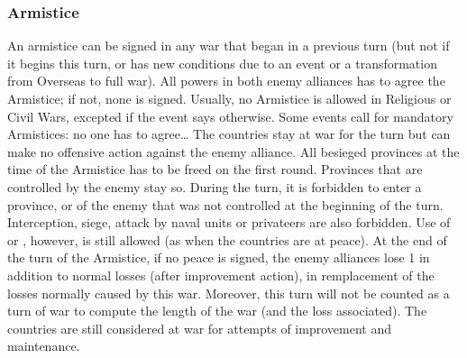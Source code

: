 \subsubsection{Armistice}
\aparag An armistice can be signed in any war that began in a previous turn
(but not if it begins this turn, or has new conditions due to an event or a
transformation from Overseas to full war).  All powers in both enemy alliances
has to agree the Armistice; if not, none is signed.
\bparag Usually, no Armistice is allowed in Religious or Civil Wars, excepted
if the event says otherwise.
\bparag Some events call for mandatory Armistices: no one has to agree\ldots
\aparag The countries stay at war for the turn but can make no offensive
action against the enemy alliance. All besieged provinces at the time of the
Armistice has to be freed on the first round. Provinces that are controlled by
the enemy stay so.
\bparag During the turn, it is forbidden to enter a province, \COL or \TP of
the enemy that was not controlled at the beginning of the turn.  Interception,
siege, attack by naval units or privateers are also forbidden.
\bparag Use of \Presidios or \StraitFort, however, is still allowed (as when
the countries are at peace).
\aparag At the end of the turn of the Armistice, if no peace is signed, the
enemy alliances lose 1 \STAB in addition to normal losses (after \STAB
improvement action), in remplacement of the \STAB losses normally caused by
this war. Moreover, this turn will not be counted as a turn of war to compute
the length of the war (and the \STAB loss associated).
\bparag The countries are still considered at war for attempts of \STAB
improvement
and maintenance.


